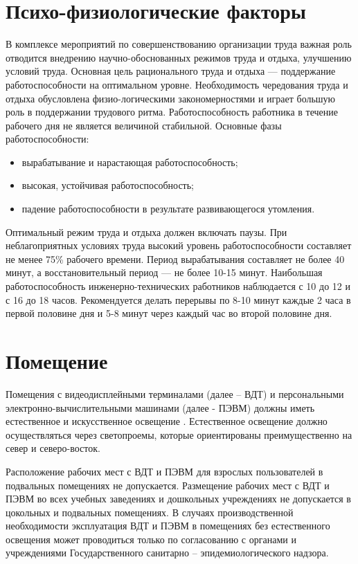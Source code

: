 \documentclass[12pt,a4paper]{report}
\begin{document}
\section{Психо-физиологические факторы}
В комплексе мероприятий по совершенствованию организации труда важная роль отводится внедрению научно-обоснованных режимов труда и отдыха, улучшению условий труда. Основная цель рационального труда и отдыха — поддержание работоспособности на оптимальном уровне. Необходимость чередования труда и отдыха обусловлена физио-логическими закономерностями и играет большую роль в поддержании трудового ритма. Работоспособность работника в течение рабочего дня не является величиной стабильной. Основные фазы работоспособности:
\begin{itemize}
\item вырабатывание и нарастающая работоспособность;
\item высокая, устойчивая работоспособность;
\item падение работоспособности в результате развивающегося утомления.
\end{itemize}

Оптимальный режим труда и отдыха должен включать паузы. При неблагоприятных условиях труда высокий уровень работоспособности составляет не менее 75\% рабочего времени. Период вырабатывания составляет не более 40 минут, а восстановительный период — не более 10-15 минут. Наибольшая работоспособность инженерно-технических работников наблюдается с 10 до 12 и с 16 до 18 часов. Рекомендуется делать перерывы по 8-10 минут каждые 2 часа в первой половине дня и 5-8 минут через каждый час во второй половине дня.

\section{Помещение}
Помещения с видеодисплейными терминалами (далее – ВДТ) и персональными электронно-вычислительными машинами (далее - ПЭВМ) должны иметь естественное и искусственное освещение \cite{Li}. Естественное освещение должно осуществляться через светопроемы, которые ориентированы преимущественно на север и северо-восток.

Расположение рабочих мест с ВДТ и ПЭВМ для взрослых пользователей в подвальных помещениях не допускается. Размещение рабочих мест с ВДТ и ПЭВМ во всех учебных заведениях и дошкольных учреждениях не допускается в цокольных и подвальных помещениях. В случаях производственной необходимости эксплуатация ВДТ и ПЭВМ в помещениях без естественного освещения может проводиться только по согласованию с органами и учреждениями Государственного санитарно – эпидемиологического надзора.
\end{document}
